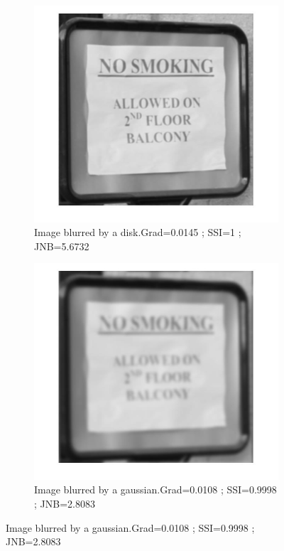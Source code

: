 \begin{figure}
\begin{subfigure}[b]{0.3\textwidth}
        \end{subfigure}
        \begin{subfigure}[b]{0.3\textwidth}
                 \centering
                 \includegraphics[width=\textwidth]{sign_D.jpg}
                 \caption{Image blurred by a disk.\newline Grad=0.0145 ; SSI=1 ; JNB=5.6732}
                       
        \end{subfigure}
        \begin{subfigure}[b]{0.3\textwidth}
                \centering
                \includegraphics[width=\textwidth]{sign_G.jpg}
                \caption{Image blurred by a gaussian.\newline Grad=0.0108 ; SSI=0.9998 ; JNB=2.8083} 
        \end{subfigure} 
       

\end{figure}
